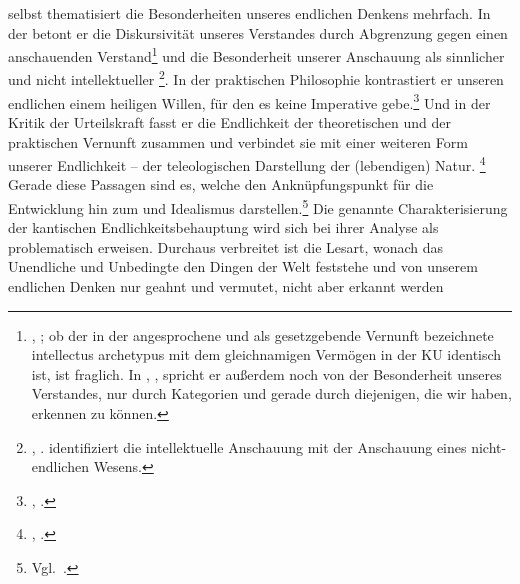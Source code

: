  selbst thematisiert die Besonderheiten unseres endlichen Denkens
mehrfach. In der  betont er die Diskursivität
unseres Verstandes durch Abgrenzung gegen einen anschauenden Verstand\footnote{\cite[Vgl.][]{Kant:KritikderreinenVernunft2003},
\cite[][III: 112.20--33]{Kant:GesammelteWerke1900ff.}; ob der in der
\cite{Kant:KritikderreinenVernunft2003} \parencite[][III: 456.37]{Kant:GesammelteWerke1900ff.}
angesprochene und als gesetzgebende Vernunft bezeichnete intellectus archetypus mit dem gleichnamigen
Vermögen in der KU identisch ist, ist fraglich. In
\cite[][\S~21]{Kant:KritikderreinenVernunft2003}, \cite[][III:
116.23--29]{Kant:GesammelteWerke1900ff.}, spricht er außerdem noch von der
Besonderheit unseres Verstandes, nur durch Kategorien und gerade durch
diejenigen, die wir haben, erkennen zu können.} und die Besonderheit unserer
Anschauung als sinnlicher und nicht intellektueller%
\footnote{\cite[Vgl.][]{Kant:KritikderreinenVernunft2003}, \cite[][III:
24.16--21, 72.29--73.2, 210.21--34, 225.35]{Kant:GesammelteWerke1900ff.}.
\cite[In][III: 72f.]{Kant:GesammelteWerke1900ff.} identifiziert die
intellektuelle Anschauung mit der Anschauung eines nicht-endlichen Wesens.}. In der praktischen
Philosophie kontrastiert er unseren endlichen einem heiligen Willen, für den es
keine Imperative gebe.\footnote{\cite[Vgl.][]{Kant:KritikderpraktischenVernunft1974}, \cite[][V:
32.16--33.5, 79.27--35]{Kant:GesammelteWerke1900ff.}.} Und in der Kritik der
Urteilskraft fasst er die Endlichkeit der theoretischen und der praktischen
Vernunft zusammen und verbindet sie mit einer weiteren Form unserer Endlichkeit
-- der teleologischen Darstellung der (lebendigen) Natur.%
\footnote{\cite[Vgl.][\S~77]{Kant:KritikderUrteilskraft2009}, \cite[][V:
405--410.11]{Kant:GesammelteWerke1900ff.}.} Gerade diese Passagen sind es,
welche den Anknüpfungspunkt für die Entwicklung hin zum  und
 Idealismus darstellen.\footnote{Vgl.\
\cite{Foerster:DieBedeutungvonSS7677deremphKritikderUrteilskraftfuerdieEntwicklungdernachkantischenPhilosophieTeil12002,Foerster:DieBedeutungvonSS7677deremphKritikderUrteilskraftfuerdieEntwicklungdernachkantischenPhilosophieTeil22002,Engfer:MenschlicheVernunft2002}.}
Die genannte Charakterisierung der kantischen Endlichkeitsbehauptung wird sich
bei ihrer Analyse als problematisch erweisen. 
Durchaus verbreitet ist die Lesart, wonach das
Unendliche und Unbedingte  den Dingen der Welt feststehe und von
unserem endlichen Denken nur geahnt und vermutet, nicht aber erkannt werden
